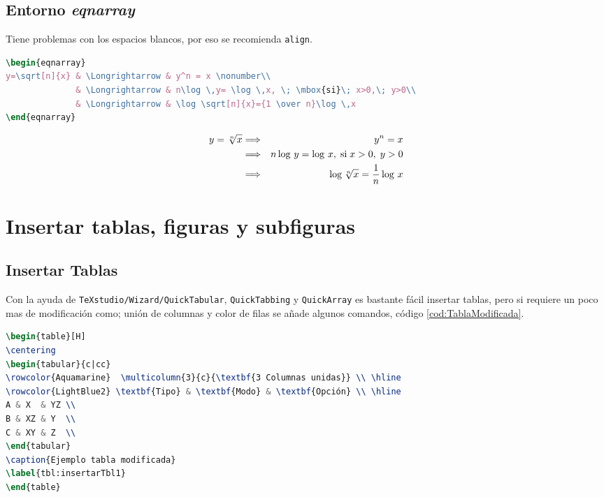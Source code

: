 \subsection{Entorno \textit{eqnarray}}
Tiene problemas con los espacios blancos, por eso se recomienda \verb|align|.

\begin{lstlisting}[language=tex, caption={}, label={}]
% Numeración selectiva
\begin{eqnarray}
y=\sqrt[n]{x} & \Longrightarrow & y^n = x \nonumber\\
			  & \Longrightarrow & n\log \,y= \log \,x, \; \mbox{si}\; x>0,\; y>0\\
			  & \Longrightarrow & \log \sqrt[n]{x}={1 \over n}\log \,x
\end{eqnarray}
\end{lstlisting}
\begin{eqnarray}
y=\sqrt[n]{x} & \Longrightarrow & y^n = x \nonumber\\
			  & \Longrightarrow & n\log \,y= \log \,x, \; \mbox{si}\; x>0,\; y>0\\
			  & \Longrightarrow & \log \sqrt[n]{x}={1 \over n}\log \,x
\end{eqnarray}



\section{Insertar tablas, figuras y subfiguras}
\subsection{Insertar Tablas}
Con la ayuda de \verb|TeXstudio/Wizard/QuickTabular|, \verb|QuickTabbing| y \verb|QuickArray| es bastante fácil insertar tablas, pero si requiere un poco mas de modificación como; unión de columnas y color de filas se añade algunos comandos, código \ref{cod:TablaModificada}.

\begin{lstlisting}[language=tex, caption={Insertar tabla modificada}, label={cod:TablaModificada}]
\begin{table}[H]
\centering
\begin{tabular}{c|cc}
\rowcolor{Aquamarine}  \multicolumn{3}{c}{\textbf{3 Columnas unidas}} \\ \hline
\rowcolor{LightBlue2} \textbf{Tipo} & \textbf{Modo} & \textbf{Opción} \\ \hline
A & X  & YZ \\ 
B & XZ & Y  \\ 
C & XY & Z  \\ 			 
\end{tabular} 
\caption{Ejemplo tabla modificada}
\label{tbl:insertarTbl1}
\end{table}
\end{lstlisting}

